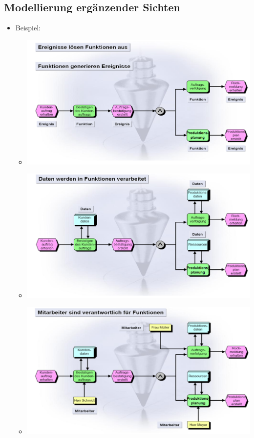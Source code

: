 \documentclass[11pt,a4paper]{article}
\begin{document}
\subsection{Modellierung ergänzender Sichten}
\begin{itemize}
	\item Beispiel:
		\begin{itemize}
		\item[] \includegraphics[width=15cm]{Bilder/eepk1}
		\item[] \includegraphics[width=15cm]{Bilder/eepk2}
		\item[] \includegraphics[width=15cm]{Bilder/eepk3}

\end{itemize}
\end{itemize}
\end{document}
